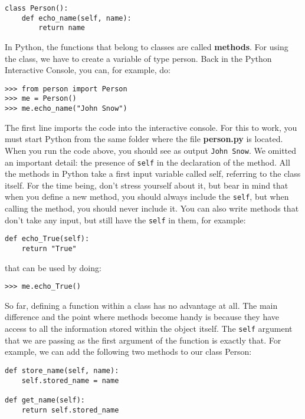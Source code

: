 \begin{verbatim}
class Person():
    def echo_name(self, name):
        return name
\end{verbatim}

In Python, the functions that belong to classes are called \textbf{methods}. For using the class, we have to create a variable of type person. Back in the Python Interactive Console, you can, for example, do:

\begin{verbatim}
>>> from person import Person
>>> me = Person()
>>> me.echo_name("John Snow")
\end{verbatim}

The first line imports the code into the interactive console. For this to work, you must start Python from the same folder where the file \textbf{person.py} is located. When you run the code above, you should see as output \texttt{John Snow}. We omitted an important detail: the presence of \texttt{self} in the declaration of the method. All the methods in Python take a first input variable called self, referring to the class itself. For the time being, don't stress yourself about it, but bear in mind that when you define a new method, you should always include the \texttt{self}, but when calling the method, you should never include it. You can also write methods that don't take any input, but still have the \texttt{self} in them, for example:

\begin{verbatim}
def echo_True(self):
    return "True"
\end{verbatim}

that can be used by doing:

\begin{verbatim}
>>> me.echo_True()
\end{verbatim}

So far, defining a function within a class has no advantage at all. The main difference and the point where methods become handy is because they have access to all the information stored within the object itself. The \texttt{self} argument that we are passing as the first argument of the function is exactly that. For example, we can add the following two methods to our class Person:

\begin{verbatim}
def store_name(self, name):
    self.stored_name = name

def get_name(self):
    return self.stored_name
\end{verbatim}


